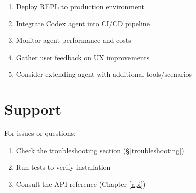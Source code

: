 \documentclass[12pt,oneside,openany]{book}
\begin{document}
\begin{enumerate}
    \item Deploy REPL to production environment
    \item Integrate Codex agent into CI/CD pipeline
    \item Monitor agent performance and costs
    \item Gather user feedback on UX improvements
    \item Consider extending agent with additional tools/scenarios
\end{enumerate}

\section{Support}

For issues or questions:
\begin{enumerate}
    \item Check the troubleshooting section (\S\ref{troubleshooting})
    \item Run tests to verify installation
    \item Consult the API reference (Chapter \ref{api})
\end{enumerate}
\end{document}
